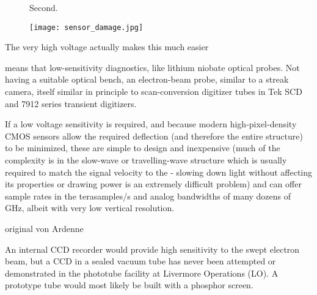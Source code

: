 \documentclass[paper.tex]{subfiles}
\begin{document}
\begin{figure}[H]
	\centering
	\hfill
		\hfill

	\caption{Second.}
		\hfill

\end{figure}



\begin{figure}[H]
	\captionsetup{singlelinecheck = false, justification=justified}
	\centering
	\texttt{[image: sensor\_damage.jpg]}
	\caption{}
\end{figure}


\begin{figure}[H]
	\captionsetup{singlelinecheck = false, justification=justified}
	\centering
	
	\caption{}
\end{figure}


The very high voltage actually makes this much easier

means that low-sensitivity diagnostics, like lithium niobate optical probes. Not having a suitable optical bench, an electron-beam probe, similar to a streak camera, itself similar in principle to scan-conversion digitizer tubes in Tek SCD and 7912 series transient digitizers.

If a low voltage sensitivity is required, and because modern high-pixel-density CMOS sensors allow the required deflection (and therefore the entire structure) to be minimized, these are simple to design and inexpensive (much of the complexity is in the slow-wave or travelling-wave structure which is usually required to match the signal velocity to the - slowing down light without affecting its properties or drawing power is an extremely difficult problem) and can offer sample rates in the terasamples/s and analog bandwidths of many dozens of GHz, albeit with very low vertical resolution. 

original von Ardenne 


\begin{fquote}
An internal CCD recorder would provide high sensitivity to the swept electron beam, but a CCD in a sealed vacuum tube has never been attempted or demonstrated in the phototube facility at Livermore Operations (LO). A prototype tube would most likely be built with a phosphor screen.
\end{fquote}
\end{document}
